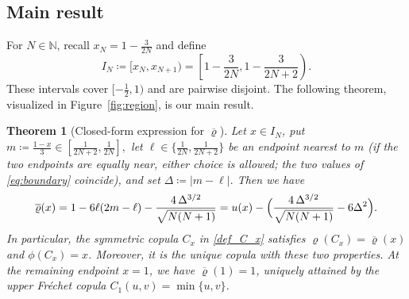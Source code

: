 \documentclass{article}
\newtheorem{theorem}{Theorem}[section]
\newcommand{\brho}{\overline\varrho}
\newcommand{\N}{\mathbb{N}}
\begin{document}
\subsection{Main result}

For \(N\in \N\), recall \(x_N = 1 - \frac{3}{2N}\) and define 
\begin{equation}\label{eq:intervals}
	I_N \coloneqq [x_N,x_{N+1}) = \left[1-\frac{3}{2N},1-\frac{3}{2N+2}\right).
\end{equation}
These intervals cover $[-\tfrac12,1)$ and are pairwise disjoint.
The following theorem, visualized in Figure~\ref{fig:region}, is our main result.

\begin{theorem}[Closed-form expression for \(\brho\)]\label{thm:main}
	Let $x\in I_N$, put
	\(
	m\coloneqq\tfrac{1-x}{3}\in[\tfrac{1}{2N+2},\tfrac{1}{2N}],
	\)
	let $\ell\in\{\tfrac{1}{2N},\tfrac{1}{2N+2}\}$ be an endpoint nearest to $m$ (if the two endpoints are equally near, either choice is allowed; the two values of \eqref{eq:boundary} coincide), and set
	\(
	\Delta\coloneqq|m-\ell|.
	\)
    Then we have
	\begin{equation}\label{eq:boundary}
		\brho(x) = 1 - 6\ell(2m-\ell) - \frac{4\,\Delta^{3/2}}{\sqrt{N(N+1)}}
		= u(x) - \Bigl(\frac{4\,\Delta^{3/2}}{\sqrt{N(N+1)}} - 6\Delta^2\Bigr).
	\end{equation}
    In particular, the symmetric copula \(C_x\) in \eqref{def_C_x} satisfies \(\varrho(C_x) = \brho(x)\) and \(\phi(C_x) = x\).
    Moreover, it is the unique copula with these two properties.
    At the remaining endpoint \(x=1\), we have \(\brho(1)=1\), uniquely attained by the upper Fr\'{e}chet copula \(C_1(u,v)=\min\{u,v\}\).
\end{theorem}
\end{document}
